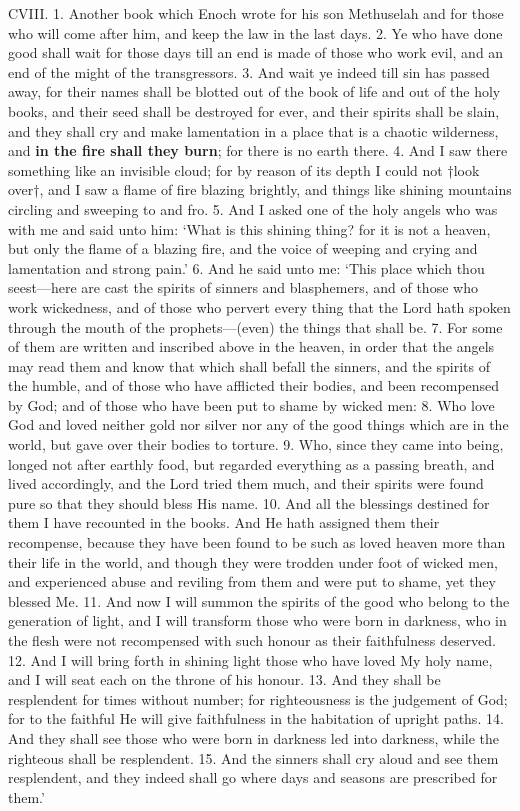 CVIII. 1. Another book which Enoch wrote for
his son Methuselah and for those who will come after
him, and keep the law in the last days. 2. Ye who
have done good shall wait for those days till an end
is made of those who work evil, and an end of the
might of the transgressors. 3. And wait ye indeed
till sin has passed away, for their names shall be
blotted out of the book of life and out of the holy
books, and their seed shall be destroyed for ever, and
their spirits shall be slain, and they shall cry and make
lamentation in a place that is a chaotic wilderness, and
\textbf{in the fire shall they burn}; for there is no earth
there. 4. And I saw there something like an invisible
cloud; for by reason of its depth I could not
†look over†, and I saw a flame of fire blazing brightly,
and things like shining mountains circling and sweeping
to and fro. 5. And I asked one of the holy angels
who was with me and said unto him: ‘What is this
shining thing? for it is not a heaven, but only the
flame of a blazing fire, and the voice of weeping and
crying and lamentation and strong pain.’ 6. And
he said unto me: ‘This place which thou seest—here
are cast the spirits of sinners and blasphemers, and
of those who work wickedness, and of those who
pervert every thing that the Lord hath spoken
through the mouth of the prophets—(even) the things
that shall be. 7. For some of them are written and
inscribed above in the heaven, in order that the angels
may read them and know that which shall befall the
sinners, and the spirits of the humble, and of those
who have afflicted their bodies, and been recompensed
by God; and of those who have been put to shame by
wicked men: 8. Who love God and loved neither
gold nor silver nor any of the good things which are
in the world, but gave over their bodies to torture.
9. Who, since they came into being, longed not after
earthly food, but regarded everything as a passing
breath, and lived accordingly, and the Lord tried them
much, and their spirits were found pure so that they
should bless His name. 10. And all the blessings
destined for them I have recounted in the books.
And He hath assigned them their recompense,
because they have been found to be such as loved
heaven more than their life in the world, and though
they were trodden under foot of wicked men, and
experienced abuse and reviling from them and were
put to shame, yet they blessed Me. 11. And now I
will summon the spirits of the good who belong to
the generation of light, and I will transform those
who were born in darkness, who in the flesh were not
recompensed with such honour as their faithfulness
deserved. 12. And I will bring forth in shining
light those who have loved My holy name, and I
will seat each on the throne of his honour. 13. And
they shall be resplendent for times without number;
for righteousness is the judgement of God; for to
the faithful He will give faithfulness in the habitation
of upright paths. 14. And they shall see those who
were born in darkness led into darkness, while the
righteous shall be resplendent. 15. And the sinners
shall cry aloud and see them resplendent, and they
indeed shall go where days and seasons are prescribed
for them.’
